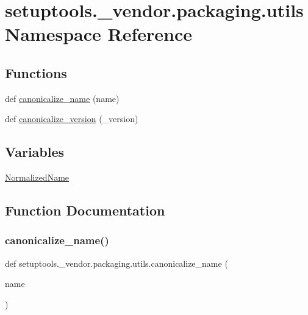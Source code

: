 \hypertarget{namespacesetuptools_1_1__vendor_1_1packaging_1_1utils}{}\section{setuptools.\+\_\+vendor.\+packaging.\+utils Namespace Reference}
\label{namespacesetuptools_1_1__vendor_1_1packaging_1_1utils}
\subsection*{Functions}
\begin{DoxyCompactItemize}
\item 
def \hyperlink{namespacesetuptools_1_1__vendor_1_1packaging_1_1utils_a52e48cb5664a5964cabd98191dc39725}{canonicalize\+\_\+name} (name)
\item 
def \hyperlink{namespacesetuptools_1_1__vendor_1_1packaging_1_1utils_a85ebffaaaa81b57007d93683941145f8}{canonicalize\+\_\+version} (\+\_\+version)
\end{DoxyCompactItemize}
\subsection*{Variables}
\begin{DoxyCompactItemize}
\item 
\hyperlink{namespacesetuptools_1_1__vendor_1_1packaging_1_1utils_a9d8d1f1cc71ac71bf313fe0a90f993d9}{Normalized\+Name}
\end{DoxyCompactItemize}


\subsection{Function Documentation}
\mbox{\label{namespacesetuptools_1_1__vendor_1_1packaging_1_1utils_a52e48cb5664a5964cabd98191dc39725}} 
\subsubsection{\texorpdfstring{canonicalize\+\_\+name()}{canonicalize\_name()}}
{\footnotesize\ttfamily def setuptools.\+\_\+vendor.\+packaging.\+utils.\+canonicalize\+\_\+name (\begin{DoxyParamCaption}\item[{}]{name }\end{DoxyParamCaption})}

